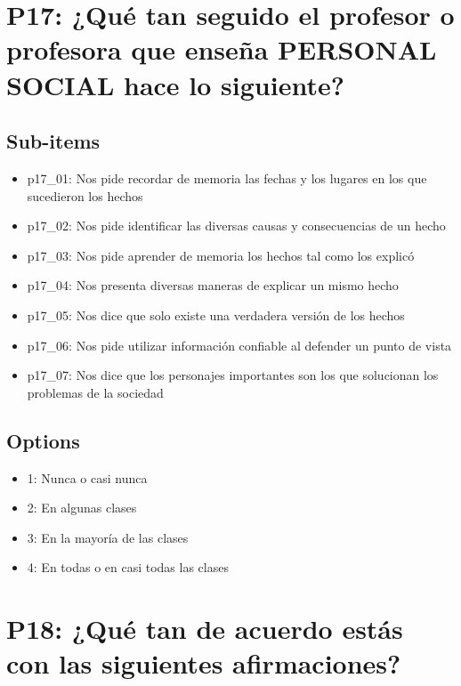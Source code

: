 \documentclass[11pt]{article}
\begin{document}
\section*{P17: ¿Qué tan seguido el profesor o profesora que enseña PERSONAL SOCIAL hace lo siguiente?}
\subsection*{Sub-items}
\begin{itemize}[leftmargin=*]
  \item p17\_01: Nos pide recordar de memoria las fechas y los lugares en los que sucedieron los hechos
  \item p17\_02: Nos pide identificar las diversas causas y consecuencias de un hecho
  \item p17\_03: Nos pide aprender de memoria los hechos tal como los explicó
  \item p17\_04: Nos presenta diversas maneras de explicar un mismo hecho
  \item p17\_05: Nos dice que solo existe una verdadera versión de los hechos
  \item p17\_06: Nos pide utilizar información confiable al defender un punto de vista
  \item p17\_07: Nos dice que los personajes importantes son los que solucionan los problemas de la sociedad
\end{itemize}
\subsection*{Options}
\begin{itemize}[leftmargin=*]
  \item 1: Nunca o casi nunca
  \item 2: En algunas clases
  \item 3: En la mayoría de las clases
  \item 4: En todas o en casi todas las clases
\end{itemize}
\bigskip
\section*{P18: ¿Qué tan de acuerdo estás con las siguientes afirmaciones?}
\end{document}
